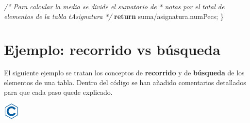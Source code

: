 \documentclass[
]{book}
\newenvironment{Shaded}{\begin{snugshade}}{\end{snugshade}}
\newcommand{\CommentTok}[1]{\textcolor[rgb]{0.56,0.35,0.01}{\textit{#1}}}
\newcommand{\ControlFlowTok}[1]{\textcolor[rgb]{0.13,0.29,0.53}{\textbf{#1}}}
\newcommand{\NormalTok}[1]{#1}
\begin{document}
\begin{Shaded}
\begin{Highlighting}[]
    \CommentTok{/* Para calcular la media se divide el sumatorio de}
\CommentTok{     * notas por el total de elementos de la tabla tAsignatura}
\CommentTok{     */}
    \ControlFlowTok{return}\NormalTok{ suma/asignatura.numPecs;}
\NormalTok{\}}
\end{Highlighting}
\end{Shaded}

\hypertarget{ejemplo-recorrido-vs-buxfasqueda}{%
\section{Ejemplo: recorrido vs búsqueda}\label{ejemplo-recorrido-vs-buxfasqueda}}

El siguiente ejemplo se tratan los conceptos de \textbf{recorrido} y de \textbf{búsqueda} de los elementos de una tabla. Dentro del código se han añadido comentarios detallados para que cada paso quede explicado.

\includegraphics{./img/c.png}
\end{document}
